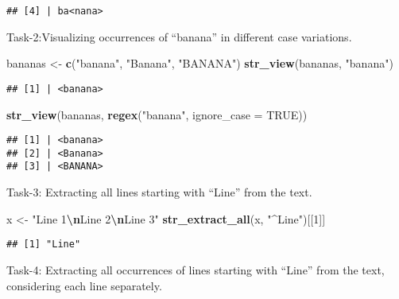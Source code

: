 \documentclass[
]{article}
\newenvironment{Shaded}{\begin{snugshade}}{\end{snugshade}}
\newcommand{\AttributeTok}[1]{\textcolor[rgb]{0.13,0.29,0.53}{#1}}
\newcommand{\ConstantTok}[1]{\textcolor[rgb]{0.56,0.35,0.01}{#1}}
\newcommand{\DecValTok}[1]{\textcolor[rgb]{0.00,0.00,0.81}{#1}}
\newcommand{\FunctionTok}[1]{\textcolor[rgb]{0.13,0.29,0.53}{\textbf{#1}}}
\newcommand{\NormalTok}[1]{#1}
\newcommand{\OtherTok}[1]{\textcolor[rgb]{0.56,0.35,0.01}{#1}}
\newcommand{\SpecialCharTok}[1]{\textcolor[rgb]{0.81,0.36,0.00}{\textbf{#1}}}
\newcommand{\StringTok}[1]{\textcolor[rgb]{0.31,0.60,0.02}{#1}}
\begin{document}
\begin{verbatim}
## [4] | ba<nana>
\end{verbatim}

Task-2:Visualizing occurrences of ``banana'' in different case
variations.

\begin{Shaded}
\begin{Highlighting}[]
\NormalTok{bananas }\OtherTok{\textless{}{-}} \FunctionTok{c}\NormalTok{(}\StringTok{"banana"}\NormalTok{, }\StringTok{"Banana"}\NormalTok{, }\StringTok{"BANANA"}\NormalTok{)}
\FunctionTok{str\_view}\NormalTok{(bananas, }\StringTok{"banana"}\NormalTok{)}
\end{Highlighting}
\end{Shaded}

\begin{verbatim}
## [1] | <banana>
\end{verbatim}

\begin{Shaded}
\begin{Highlighting}[]
\FunctionTok{str\_view}\NormalTok{(bananas, }\FunctionTok{regex}\NormalTok{(}\StringTok{"banana"}\NormalTok{, }\AttributeTok{ignore\_case =} \ConstantTok{TRUE}\NormalTok{))}
\end{Highlighting}
\end{Shaded}

\begin{verbatim}
## [1] | <banana>
## [2] | <Banana>
## [3] | <BANANA>
\end{verbatim}

Task-3: Extracting all lines starting with ``Line'' from the text.

\begin{Shaded}
\begin{Highlighting}[]
\NormalTok{x }\OtherTok{\textless{}{-}} \StringTok{"Line 1}\SpecialCharTok{\textbackslash{}n}\StringTok{Line 2}\SpecialCharTok{\textbackslash{}n}\StringTok{Line 3"}
\FunctionTok{str\_extract\_all}\NormalTok{(x, }\StringTok{"\^{}Line"}\NormalTok{)[[}\DecValTok{1}\NormalTok{]]}
\end{Highlighting}
\end{Shaded}

\begin{verbatim}
## [1] "Line"
\end{verbatim}

Task-4: Extracting all occurrences of lines starting with ``Line'' from
the text, considering each line separately.
\end{document}
